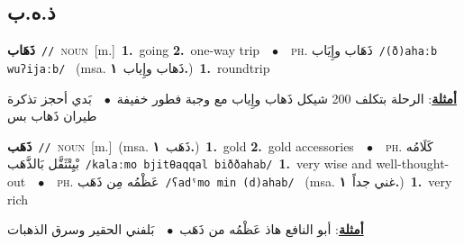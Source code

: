 \documentclass[10pt,a4paper,twoside]{article} %
\begin{document}
\begin{multicols}{2}
\vspace{-3mm}
\subsection*{\color{blue}\foreignlanguage{arabic}{ذ.ه.ب}\color{blue}{}} 

{\setlength\topsep{0pt}\textbf{\foreignlanguage{arabic}{ذَهَاب}}\ {\color{gray}\texttt{//}\color{black}}\ \textsc{noun}\ [m.]\ \textbf{1.}~going  \textbf{2.}~one-way trip\ \ $\bullet$\ \ \textsc{ph.} \color{gray} \foreignlanguage{arabic}{ذَهَاب وإِيَاب}\color{black}\ {\color{gray}\texttt{/{\sffamily (ð)ahaːb wuʔijaːb}/}\color{black}}\ \color{gray} (msa. \foreignlanguage{arabic}{ذَهاب وإِياب}~\foreignlanguage{arabic}{\textbf{١.}})\color{black}\ \textbf{1.}~roundtrip\  \begin{flushright}\color{gray}\foreignlanguage{arabic}{\textbf{\underline{\foreignlanguage{arabic}{أمثلة}}}: الرحلة بتكلف 200 شيكل ذَهاب وإِياب مع وجبة فطور خفيفة\ $\bullet$\ \  بَدي أحجز تذكرة طيران ذَهاب بس}\end{flushright}\color{black}} \vspace{2mm}

{\setlength\topsep{0pt}\textbf{\foreignlanguage{arabic}{ذَهَب}}\ {\color{gray}\texttt{//}\color{black}}\ \textsc{noun}\ [m.]\ \color{gray}(msa. \foreignlanguage{arabic}{ذَهَب}~\foreignlanguage{arabic}{\textbf{١.}})\color{black}\ \textbf{1.}~gold  \textbf{2.}~gold accessories\ \ $\bullet$\ \ \textsc{ph.} \color{gray} \foreignlanguage{arabic}{كَلَامُه بْيِتْثَقَّل بَالذَّهَب}\color{black}\ {\color{gray}\texttt{/{\sffamily kalaːmo bjitθaqqal biððahab}/}\color{black}}\ \textbf{1.}~very wise and well-thought-out\ \ $\bullet$\ \ \textsc{ph.} \color{gray} \foreignlanguage{arabic}{عَظْمُه مِن ذَهَب}\color{black}\ {\color{gray}\texttt{/{\sffamily ʕadˤmo min (d)ahab}/}\color{black}}\ \color{gray} (msa. \foreignlanguage{arabic}{غني جداً}~\foreignlanguage{arabic}{\textbf{١.}})\color{black}\ \textbf{1.}~very rich\  \begin{flushright}\color{gray}\foreignlanguage{arabic}{\textbf{\underline{\foreignlanguage{arabic}{أمثلة}}}: أبو النافع هاذ عَظْمُه من ذَهَب\ $\bullet$\ \  بَلفني الحقير وسرق الذهبات}\end{flushright}\color{black}} \vspace{2mm}


\end{multicols}
\end{document}
